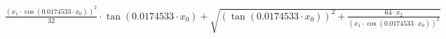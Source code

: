 \documentclass{article}
\begin{document}
$\frac{{(x_{1} \cdot \cos(0.0174533 \cdot x_{0}))}^2}{32} \cdot \tan(0.0174533 \cdot x_{0}) + \sqrt{{(\tan(0.0174533 \cdot x_{0}))}^2 + \frac{64 \cdot x_{2}}{{(x_{1} \cdot \cos(0.0174533 \cdot x_{0}))}^2}}$
 	
\end{document}
